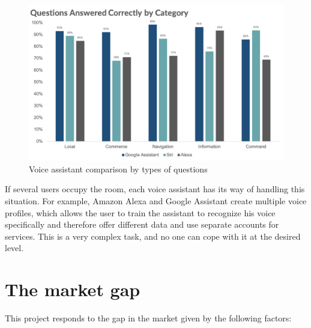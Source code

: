 \begin{figure}[H]
    \centering
    \includegraphics[width=\textwidth]{img/voice_assistant_comparison.png}
    \caption{Voice assistant comparison by types of questions}
    \label{fig:voice_assistant_comparison}
\end{figure}

If several users occupy the room, each voice assistant has its way of handling this situation. For example, Amazon Alexa and Google Assistant create multiple voice profiles, which allows the user to train the assistant to recognize his voice specifically and therefore offer different data and use separate accounts for services. This is a very complex task, and no one can cope with it at the desired level.



\section{The market gap}

This project responds to the gap in the market given by the following factors:

